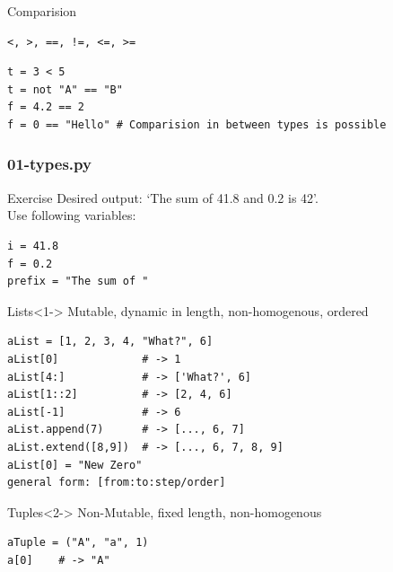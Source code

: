 \documentclass{beamer}
\begin{document}
\begin{frame}[fragile]
	\begin{block}{Comparision}
		\begin{verbatim}
<, >, ==, !=, <=, >=
		\end{verbatim}
	\end{block}
	\begin{example}{}
		\begin{verbatim}
t = 3 < 5 
t = not "A" == "B"
f = 4.2 == 2
f = 0 == "Hello" # Comparision in between types is possible
		\end{verbatim}
	\end{example}
\end{frame}

\begin{frame}[fragile]
	\frametitle{01-types.py}
	\begin{exampleblock}{Exercise}
	Desired output: `The sum of 41.8 and 0.2 is 42'.\\
	Use following variables:
		\begin{verbatim}
i = 41.8
f = 0.2
prefix = "The sum of "
		\end{verbatim}
	\end{exampleblock}
\end{frame}

\begin{frame}[fragile]
	\begin{block}{Lists}<1->
Mutable, dynamic in length, non-homogenous, ordered
\begin{verbatim}
aList = [1, 2, 3, 4, "What?", 6]
aList[0]             # -> 1
aList[4:]            # -> ['What?', 6]
aList[1::2]          # -> [2, 4, 6]  
aList[-1]            # -> 6
aList.append(7)      # -> [..., 6, 7]
aList.extend([8,9])  # -> [..., 6, 7, 8, 9]
aList[0] = "New Zero"
general form: [from:to:step/order]
\end{verbatim}
	\end{block}
	\begin{block}{Tuples}<2->
	Non-Mutable, fixed length, non-homogenous
	\begin{verbatim}
aTuple = ("A", "a", 1)
a[0] 	# -> "A"
	\end{verbatim}
\end{block}
\end{frame}
\end{document}
